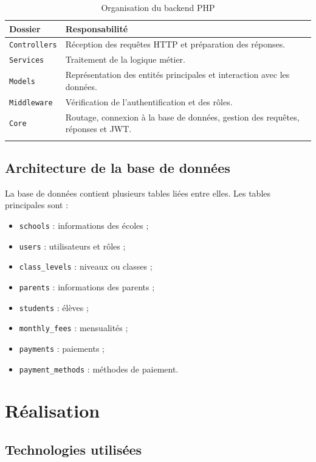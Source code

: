 \documentclass[12pt,a4paper]{report}
\begin{document}
\begin{longtable}{|p{4cm}|p{10cm}|}
\hline
\textbf{Dossier} & \textbf{Responsabilité} \\
\hline
\texttt{Controllers} & Réception des requêtes HTTP et préparation des réponses. \\
\hline
\texttt{Services} & Traitement de la logique métier. \\
\hline
\texttt{Models} & Représentation des entités principales et interaction avec les données. \\
\hline
\texttt{Middleware} & Vérification de l'authentification et des rôles. \\
\hline
\texttt{Core} & Routage, connexion à la base de données, gestion des requêtes, réponses et JWT. \\
\hline
\caption{Organisation du backend PHP}
\end{longtable}

\section{Architecture de la base de données}

La base de données contient plusieurs tables liées entre elles. Les tables principales sont :

\begin{itemize}[label=--]
    \item \texttt{schools} : informations des écoles ;
    \item \texttt{users} : utilisateurs et rôles ;
    \item \texttt{class\_levels} : niveaux ou classes ;
    \item \texttt{parents} : informations des parents ;
    \item \texttt{students} : élèves ;
    \item \texttt{monthly\_fees} : mensualités ;
    \item \texttt{payments} : paiements ;
    \item \texttt{payment\_methods} : méthodes de paiement.
\end{itemize}

\chapter{Réalisation}

\section{Technologies utilisées}
\end{document}
